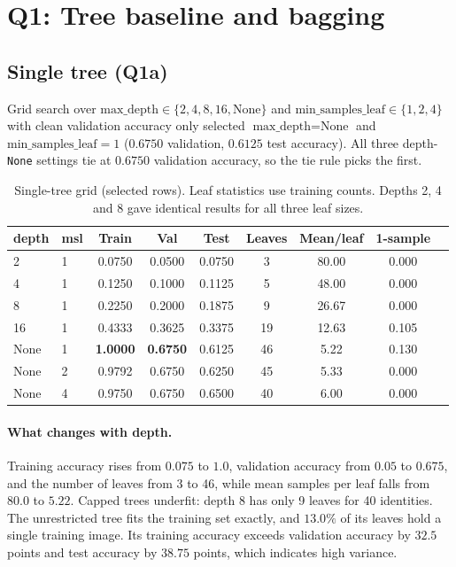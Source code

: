 \documentclass[10pt,twocolumn,letterpaper]{article}
\begin{document}
\section{Q1: Tree baseline and bagging}

\subsection{Single tree (Q1a)}
Grid search over $\text{max\_depth}\in\{2,4,8,16,\text{None}\}$ and
$\text{min\_samples\_leaf}\in\{1,2,4\}$ with clean validation accuracy only selected
$\text{max\_depth}=\text{None}$ and $\text{min\_samples\_leaf}=1$ ($0.6750$ validation, $0.6125$ test accuracy).
All three depth-\texttt{None} settings tie at $0.6750$ validation accuracy, so the tie rule picks the first.

\begin{table}[htbp]
\centering
\caption{Single-tree grid (selected rows). Leaf statistics use training counts. Depths 2, 4 and 8 gave identical results for all three leaf sizes.}
\label{tab:q1a}
\small
\setlength{\tabcolsep}{2.5pt}
\begin{tabular}{llccccccc}
\toprule
depth & msl & Train & Val & Test & Leaves & Mean/leaf & 1-sample \\
\midrule
2    & 1 & 0.0750 & 0.0500 & 0.0750 & 3  & 80.00 & 0.000 \\
4    & 1 & 0.1250 & 0.1000 & 0.1125 & 5  & 48.00 & 0.000 \\
8    & 1 & 0.2250 & 0.2000 & 0.1875 & 9  & 26.67 & 0.000 \\
16   & 1 & 0.4333 & 0.3625 & 0.3375 & 19 & 12.63 & 0.105 \\
None & 1 & \textbf{1.0000} & \textbf{0.6750} & 0.6125 & 46 & 5.22 & 0.130 \\
None & 2 & 0.9792 & 0.6750 & 0.6250 & 45 & 5.33 & 0.000 \\
None & 4 & 0.9750 & 0.6750 & 0.6500 & 40 & 6.00 & 0.000 \\
\bottomrule
\end{tabular}
\end{table}

\paragraph{What changes with depth.}
Training accuracy rises from $0.075$ to $1.0$, validation accuracy from $0.05$ to $0.675$, and the number of leaves from 3 to 46,
while mean samples per leaf falls from $80.0$ to $5.22$. Capped trees underfit: depth 8 has only 9 leaves for 40 identities.
The unrestricted tree fits the training set exactly, and $13.0\%$ of its leaves hold a single training image. Its training accuracy
exceeds validation accuracy by $32.5$ points and test accuracy by $38.75$ points, which indicates high variance.
\end{document}
